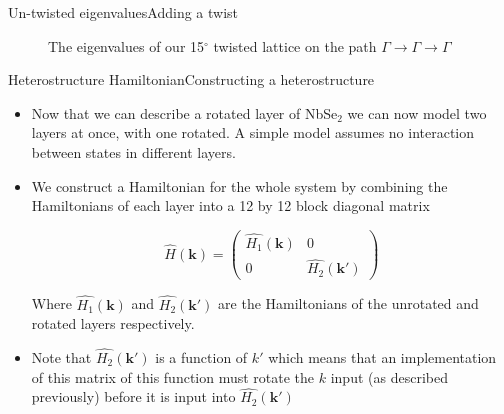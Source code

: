 \documentclass[9pt]{beamer}
\begin{document}
\begin{frame}{Un-twisted eigenvalues}{Adding a twist}
  \begin{figure}
  \centering
    \caption{The eigenvalues of our 15$^\circ$ twisted lattice on the path $\Gamma \rightarrow \Gamma \rightarrow \Gamma$}
  \end{figure}
\end{frame}

\begin{frame}{Heterostructure Hamiltonian}{Constructing a heterostructure}
  \begin{itemize}
    \item Now that we can describe a rotated layer of NbSe$_2$ we can now model two layers at once, with one rotated. A simple model assumes no interaction between states in different layers. 
    \item{We construct a Hamiltonian for the whole system by combining the Hamiltonians of each layer into a 12 by 12 block diagonal matrix

      \begin{equation}
        \hat{H}(\boldsymbol{k})=\left(\begin{array}{cc}
          \hat{H_1}(\boldsymbol{k}) & 0\\
          0 & \hat{H_2}(\boldsymbol{k'})
        \end{array}\right)
      \end{equation}
      
      Where $\hat{H_1}(\boldsymbol{k})$ and $\hat{H_2}(\boldsymbol{k'})$ are the Hamiltonians of the unrotated and rotated layers respectively.
      }
    \item Note that $\hat{H_2}(\boldsymbol{k'})$ is a function of $k'$ which means that an implementation of this matrix of this function must rotate the $k$ input (as described previously) before it is input into $\hat{H_2}(\boldsymbol{k'})$
  \end{itemize}
\end{frame}
\end{document}
